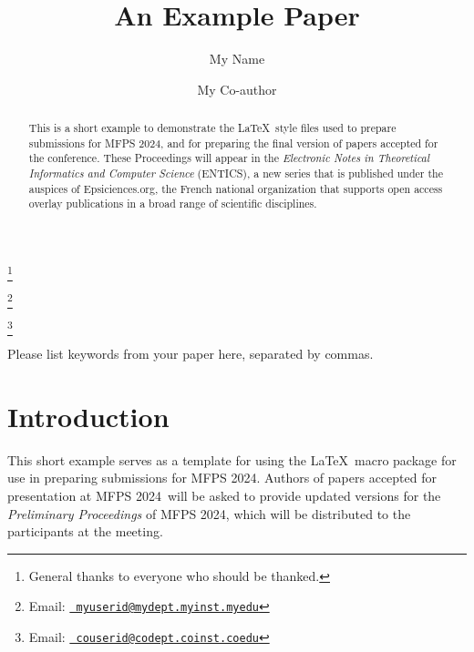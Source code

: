 \documentclass[twoside,11pt]{entics}
\def\conf{MFPS 2024} 	%
\begin{document}
\begin{frontmatter}
  \title{An Example Paper} 						%
  \thanks[ALL]{General thanks to everyone who should be thanked.}   %
  \author{My Name}	%
  \author{My Co-author}		%
  \address[a]{My Department\\ My University\\				%
    My City, My Country}
  \thanks[myemail]{Email: \href{mailto:myuserid@mydept.myinst.myedu} {\texttt{\normalshape
        myuserid@mydept.myinst.myedu}}}
  \address[b]{My Co-author's Department\\My Co-author's University\\
    My Co-author's City, My Co-author's Country}
  \thanks[coemail]{Email:  \href{mailto:couserid@codept.coinst.coedu} {\texttt{\normalshape
        couserid@codept.coinst.coedu}}}
  \begin{abstract}
    This is a short example to demonstrate the \LaTeX\ style files used to prepare
    submissions for \conf, and for preparing the final version of papers
    accepted for the conference.
    These Proceedings will appear in the \emph{Electronic Notes in Theoretical Informatics and
      Computer Science} (ENTICS), a new series that is published under the
    auspices of Epsiciences.org, the French national organization that supports open
    access overlay publications in a broad range of scientific disciplines.
  \end{abstract}
  \begin{keyword}
    Please list keywords from your paper here, separated by commas.
  \end{keyword}
\end{frontmatter}
\section{Introduction}\label{intro}
This short example serves as a template for using the \LaTeX\ macro package for
use in preparing submissions for \conf. Authors of papers accepted for
presentation at \conf\ will be asked to provide updated versions for the
\emph{Preliminary Proceedings} of \conf, which will be distributed to the
participants at the meeting.
\end{document}
